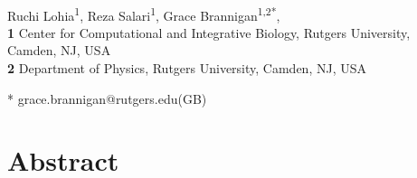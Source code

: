 \documentclass[10pt,letterpaper]{article}
\date{}
\begin{document}
\vspace*{0.2in}

\begin{flushleft}
{\Large
\textbf{} %
}
\newline
\\
Ruchi Lohia\textsuperscript{1},
Reza Salari\textsuperscript{1},
Grace Brannigan\textsuperscript{1,2*},
\\

\bigskip
\textbf{1} Center for Computational and Integrative Biology, Rutgers University, Camden, NJ, USA
\\
\textbf{2} Department of Physics, Rutgers University, Camden, NJ, USA
\\
\bigskip

% 
%

* grace.brannigan@rutgers.edu(GB)

\end{flushleft}
\section*{Abstract}
\end{document}
